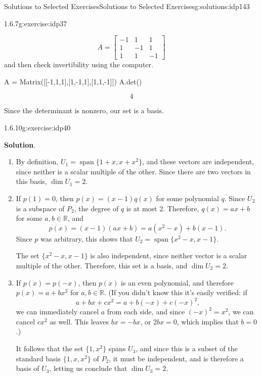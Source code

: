 \documentclass[oneside,10pt,]{book}
\newcommand{\blocktitlefont}{\relax}
\numberwithin{equation}{section}
\newcommand{\spn}{\operatorname{span}}
\newcommand{\bbm}{\begin{bmatrix}}
\newcommand{\ebm}{\end{bmatrix}}
\newcommand{\R}{\mathbb{R}}
\newcommand{\amp}{&}
\begin{document}
\begin{solutions-chapter}{Solutions to Selected Exercises}{}{Solutions to Selected Exercises}{}{}{g:solutions:idp143}
\begin{inlinesolution}{1.6.7}{}{g:exercise:idp37}
\begin{enumerate}[font=\bfseries,label=(\alph*),ref=\alph*]
\begin{equation*}
A = \bbm -1\amp 1\amp 1\\1\amp -1\amp 1\\1\amp 1\amp -1\ebm
\end{equation*}
and then check invertibility using the computer.%
\begin{sageinput}
A = Matrix([[-1,1,1],[1,-1,1],[1,1,-1]])
A.det()
\end{sageinput}
\begin{sageoutput}
\[4\]
\end{sageoutput}
Since the determinant is nonzero, our set is a basis.%
\end{enumerate}
\end{inlinesolution}%
\begin{inlinesolution}{1.6.10}{}{g:exercise:idp40}%
\par\smallskip%
\noindent\textbf{\blocktitlefont Solution}.\hypertarget{g:solution:idp153-back}{}\quad{}%
\begin{enumerate}[label=\alph*]
\item{}By definition, \(U_1 = \spn \{1+x,x+x^2\}\), and these vectors are independent, since neither is a scalar multiple of the other. Since there are two vectors in this basis, \(\dim U_1 = 2\).%
\item{}If \(p(1)=0\), then \(p(x)=(x-1)q(x)\) for some polynomial \(q\). Since \(U_2\) is a subspace of \(P_2\), the degree of \(q\) is at most 2. Therefore, \(q(x)=ax+b\) for some \(a,b\in\R\), and%
\begin{equation*}
p(x) = (x-1)(ax+b) = a(x^2-x)+b(x-1)\text{.}
\end{equation*}
Since \(p\) was arbitrary, this shows that \(U_2 = \spn\{x^2-x,x-1\}\).%
\par
The set \(\{x^2-x,x-1\}\) is also independent, since neither vector is a scalar multiple of the other. Therefore, this set is a basis, and \(\dim U_2=2\).%
\item{}If \(p(x)=p(-x)\), then \(p(x)\) is an even polynomial, and therefore \(p(x)=a+bx^2\) for \(a,b\in\R\). (If you didn't know this it's easily verified: if%
\begin{equation*}
a+bx+cx^2 = a+b(-x)+c(-x)^2\text{,}
\end{equation*}
we can immediately cancel \(a\) from each side, and since \((-x)^2=x^2\), we can cancel \(cx^2\) as well. This leaves \(bx=-bx\), or \(2bx=0\), which implies that \(b=0\).)%
\par
It follows that the set \(\{1,x^2\}\) spans \(U_3\), and since this is a subset of the standard basis \(\{1,x,x^2\}\) of \(P_2\), it must be independent, and is therefore a basis of \(U_3\), letting us conclude that \(\dim U_3=2\).%

\end{enumerate}
\end{inlinesolution}
\end{solutions-chapter}
\end{document}
